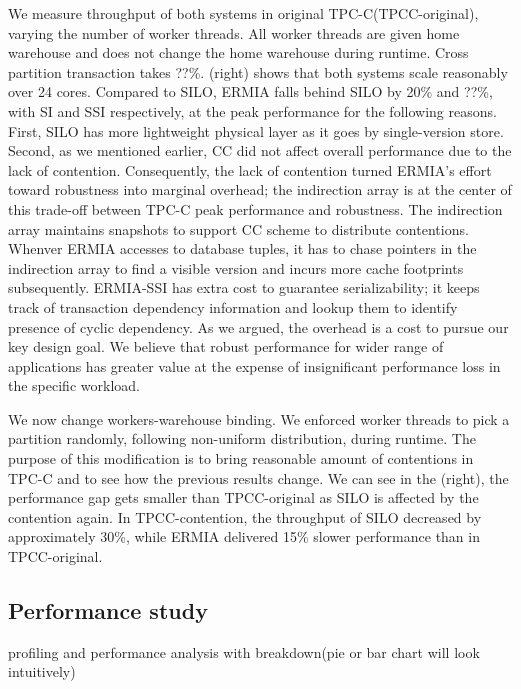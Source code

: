 We measure throughput of both systems in original TPC-C(TPCC-original), varying the number of worker threads. All worker threads are given home warehouse and does not change the home warehouse during runtime. Cross partition transaction takes ??\%. (right) shows that both systems scale reasonably over 24 cores. Compared to SILO, ERMIA falls behind SILO by 20\% and ??\%, with SI and SSI respectively, at the peak performance for the following reasons. First, SILO has more lightweight physical layer as it goes by single-version store. Second, as we mentioned earlier, CC did not affect overall performance due to the lack of contention. Consequently, the lack of contention turned ERMIA's effort toward robustness into marginal overhead; the indirection array is at the center of this trade-off between TPC-C peak performance and robustness. The indirection array maintains snapshots to support CC scheme to distribute contentions. Whenver ERMIA accesses to database tuples, it has to chase pointers in the indirection array to find a visible version and incurs more cache footprints subsequently. ERMIA-SSI has extra cost to guarantee serializability; it keeps track of transaction dependency information and lookup them to identify presence of cyclic dependency. As we argued, the overhead is a cost to pursue our key design goal. We believe that robust performance for wider range of applications has greater value at the expense of insignificant performance loss in the specific workload.

We now change workers-warehouse binding. We enforced worker threads to pick a partition randomly, following non-uniform distribution, during runtime. The purpose of this modification is to bring reasonable amount of contentions in TPC-C and to see how the previous results change. We can see in the (right), the performance gap gets smaller than TPCC-original as SILO is affected by the contention again. In TPCC-contention, the throughput of SILO decreased by approximately 30\%, while ERMIA delivered 15\% slower performance than in TPCC-original. 

\subsection{Performance study}

profiling and performance analysis with breakdown(pie or bar chart will look intuitively)

